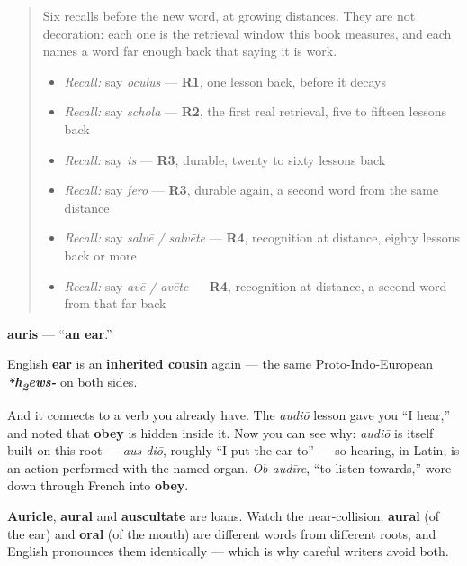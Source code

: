\begin{quote}
Six recalls before the new word, at growing distances. They are not decoration: each one is the retrieval window this book measures, and each names a word far enough back that saying it is work.

\begin{itemize}
\raggedright
  \item \emph{Recall:} say \emph{oculus} — \textbf{R1}, one lesson back, before it decays
  \item \emph{Recall:} say \emph{schola} — \textbf{R2}, the first real retrieval, five to fifteen lessons back
  \item \emph{Recall:} say \emph{is} — \textbf{R3}, durable, twenty to sixty lessons back
  \item \emph{Recall:} say \emph{ferō} — \textbf{R3}, durable again, a second word from the same distance
  \item \emph{Recall:} say \emph{salvē / salvēte} — \textbf{R4}, recognition at distance, eighty lessons back or more
  \item \emph{Recall:} say \emph{avē / avēte} — \textbf{R4}, recognition at distance, a second word from that far back
\end{itemize}
\end{quote}

\begin{cousinweb}
\textbf{auris} — \textquotedblleft{}\textbf{an ear}.\textquotedblright{}

English \textbf{ear} is an \textbf{inherited cousin} again — the same Proto-Indo-European \emph{\textbf{*h\textsubscript{2}ews-}} on both sides.

And it connects to a verb you already have. The \emph{audiō} lesson gave you \textquotedblleft{}I hear,\textquotedblright{} and noted that \textbf{obey} is hidden inside it. Now you can see why: \emph{audiō} is itself built on this root — \emph{aus-diō}, roughly \textquotedblleft{}I put the ear to\textquotedblright{} — so hearing, in Latin, is an action performed with the named organ. \emph{Ob-audīre}, \textquotedblleft{}to listen towards,\textquotedblright{} wore down through French into \textbf{obey}.

\textbf{Auricle}, \textbf{aural} and \textbf{auscultate} are loans. Watch the near-collision: \textbf{aural} (of the ear) and \textbf{oral} (of the mouth) are different words from different roots, and English pronounces them identically — which is why careful writers avoid both.
\end{cousinweb}

